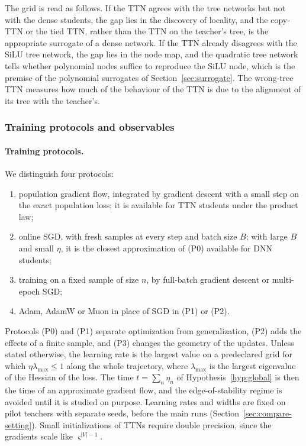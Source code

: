 \documentclass[11pt]{article}
\theoremstyle{definition}
\numberwithin{equation}{section}
\begin{document}
The grid is read as follows. If the TTN agrees with the tree networks but not with the dense students, the gap lies in the discovery of locality, and the copy-TTN or the tied TTN, rather than the TTN on the teacher's tree, is the appropriate surrogate of a dense network. If the TTN already disagrees with the SiLU tree network, the gap lies in the node map, and the quadratic tree network tells whether polynomial nodes suffice to reproduce the SiLU node, which is the premise of the polynomial surrogates of Section~\ref{sec:surrogate}. The wrong-tree TTN measures how much of the behaviour of the TTN is due to the alignment of its tree with the teacher's.

\subsubsection{Training protocols and observables}\label{sec:exp-observables}

\paragraph{Training protocols.}
We distinguish four protocols:
\begin{enumerate}[label=(P\arabic*),start=0,leftmargin=*,nosep]
\item population gradient flow, integrated by gradient descent with a small step on the exact population loss; it is available for TTN students under the product law;
\item online SGD, with fresh samples at every step and batch size $B$; with large $B$ and small $\eta$, it is the closest approximation of (P0) available for DNN students;
\item training on a fixed sample of size $n$, by full-batch gradient descent or multi-epoch SGD;
\item Adam, AdamW or Muon in place of SGD in (P1) or (P2).
\end{enumerate}
Protocols (P0) and (P1) separate optimization from generalization, (P2) adds the effects of a finite sample, and (P3) changes the geometry of the updates. Unless stated otherwise, the learning rate is the largest value on a predeclared grid for which $\eta\lambda_{\max}\le1$ along the whole trajectory, where $\lambda_{\max}$ is the largest eigenvalue of the Hessian of the loss. The time $t=\sum_n\eta_n$ of Hypothesis~\ref{hyp:global} is then the time of an approximate gradient flow, and the edge-of-stability regime \citep{cohen2021gradient} is avoided until it is studied on purpose. Learning rates and widths are fixed on pilot teachers with separate seeds, before the main runs (Section~\ref{sec:compare-setting}). Small initializations of TTNs require double precision, since the gradients scale like $\varsigma^{|V|-1}$.
\end{document}

